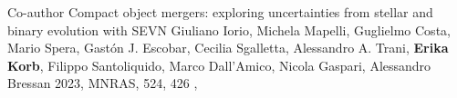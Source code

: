%
%
%

\begin{experiences}
    \publicationtags
    {Co-author}   {Compact object mergers: exploring uncertainties from stellar and binary evolution with SEVN}
    {Giuliano Iorio, Michela Mapelli, Guglielmo Costa, Mario Spera, Gastón J. Escobar, Cecilia Sgalletta, Alessandro A. Trani, \textbf{Erika Korb}, Filippo Santoliquido, Marco Dall'Amico, Nicola Gaspari, Alessandro Bressan}
    {2023, MNRAS, 524, 426}
    {,    }      
\end{experiences}
